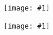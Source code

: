 \documentclass{article}
\newcommand{\img}[2]{
  \begin{center}
  \texttt{[image: \#1]}\\\vspace{2em}
  \end{center}
}
\begin{document}
  \img{1024.png}{0.35}
  \vfill
  \img{5210.png}{0.5}
\end{document}
